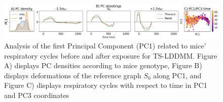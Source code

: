 \begin{figure}[t]
  \centering
  \includegraphics[width=0.95\linewidth]{"./pictures/exp2.pdf"}
  \caption{Analysis of the first Principal Component (PC1) related to mice' respiratory cycles before and after exposure for TS-LDDMM. Figure A) displays PC densities according to mice genotype, Figure B) displays  deformations of the reference graph $S_0$ along PC1, and Figure C) displays respiratory cycles with respect to time in PC1 and PC3 coordinates}
  \label{fig:exp_2_PCA}
  \vspace{-1.5em}
\end{figure}
\vspace{-1ex}
